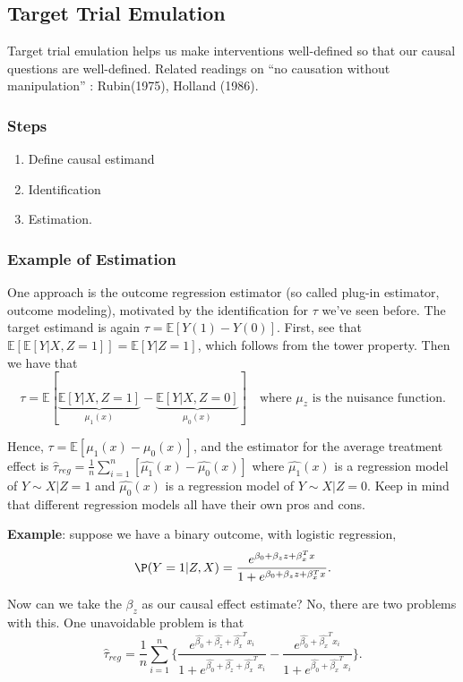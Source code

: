 \subsection{Target Trial Emulation}
Target trial emulation helps us make interventions well-defined so that our causal questions are well-defined. Related readings on ``no causation without manipulation'' : Rubin(1975), Holland (1986).

\subsubsection{Steps}

\begin{enumerate}[label=\textbf{\arabic*}]
        \item Define causal estimand
        \item Identification 
        \item Estimation. 
\end{enumerate}

\subsubsection{Example of Estimation}
One approach is the outcome regression estimator (so called plug-in estimator, outcome modeling), motivated by the identification for $\tau$ we've seen before. The target estimand is again $\tau = \mathbb{E}[Y(1)-Y(0)].$ First, see that $\mathbb{E}[\mathbb{E}[Y|X,Z= 1]] = \mathbb{E}[Y|Z=1]$, which follows from the tower property. Then we have that 
$$\tau = \mathbb{E}[\underbrace{\mathbb{E}[Y|X,Z=1]}_{\mu_1(x)} - \underbrace{\mathbb{E}[Y|X,Z=0]}_{\mu_0(x)}] \quad \text{where } \mu_z \text{ is the nuisance function.}$$

Hence, $\tau = \mathbb{E}[\mu_1(x) - \mu_0(x)]$, and the estimator for the average treatment effect is $\hat{\tau}_{reg} = \frac{1}{n}\sum_{i = 1}^{n}[\hat{\mu_1}(x) - \hat{\mu_0}(x)]$ where $\hat{\mu_1}(x)$ is a regression model of $Y \sim X|Z=1$ and $\hat{\mu_0}(x)$ is a regression model of $Y \sim X|Z=0$. Keep in mind that different regression models all have their own pros and cons.

\textbf{Example}: suppose we have a binary outcome, with logistic regression, $$\P(Y =1 | Z, X) = \frac{e^{\beta_0 + \beta_z z + \beta_x^{T} x}}{1 + e^{\beta_0 + \beta_z z + \beta_x^{T} x}}.$$

Now can we take the $\beta_z$ as our causal effect estimate? No, there are two problems with this. One unavoidable problem is that $$\hat{\tau}_{reg} = \frac{1}{n}\sum_{i = 1}^{n}\{\frac{e^{\hat{\beta_0} + \hat{\beta_z} + \hat{\beta_x}^{T} x_i}}{1 + e^{\hat{\beta_0} + \hat{\beta_z} + \hat{\beta_x}^{T} x_i}} - \frac{e^{\hat{\beta_0} + \hat{\beta_x}^{T} x_i}}{1 + e^{\hat{\beta_0} + \hat{\beta_x}^{T} x_i}}\}.$$

